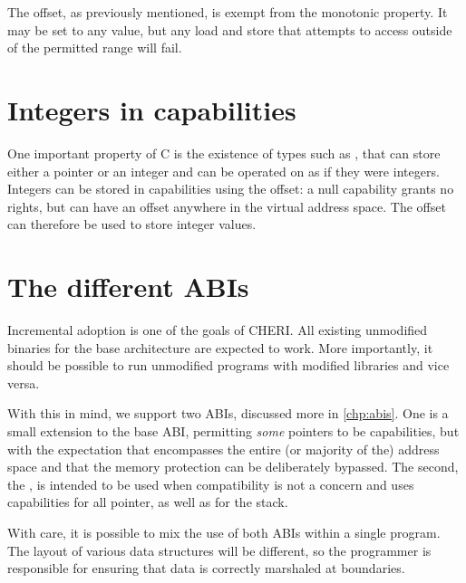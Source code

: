 The offset, as previously mentioned, is exempt from the monotonic property.  It may be set to any value, but any load and store that attempts to access outside of the permitted range will fail.  

\section{Integers in capabilities}

One important property of C is the existence of types such as , that can store either a pointer or an integer and can be operated on as if they were integers.  Integers can be stored in capabilities using the offset: a null capability grants no rights, but can have an offset anywhere in the virtual address space.  The offset can therefore be used to store integer values.

\section{The different ABIs}

Incremental adoption is one of the goals of CHERI.  All existing unmodified binaries for the base architecture are expected to work.  More importantly, it should be possible to run unmodified programs with modified libraries and vice versa.

With this in mind, we support two ABIs, discussed more in \autoref{chp:abis}.  One is a small extension to the base ABI, permitting \textit{some} pointers to be capabilities, but with the expectation that  encompasses the entire (or majority of the) address space and that the memory protection can be deliberately bypassed.  The second, the \sandboxABI{}, is intended to be used when compatibility is not a concern and uses capabilities for all pointer, as well as for the stack.

With care, it is possible to mix the use of both ABIs within a single program.  The layout of various data structures will be different, so the programmer is responsible for ensuring that data is correctly marshaled at boundaries.
